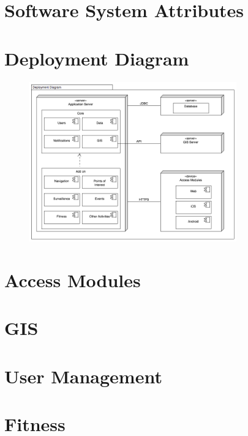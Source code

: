 \documentclass{article}
\begin{document}
\section{Software System Attributes}
	
\clearpage
\section{Deployment Diagram}
	\begin{figure}[!htbp]
		\includegraphics[width=0.8\textwidth]{Deployment/Deployment_Diagram.png}
	\end{figure}
\section{Access Modules}
	
\clearpage
\section{GIS}
	
\clearpage
\section{User Management}
	
\clearpage
\section{Fitness}
	
\end{document}
